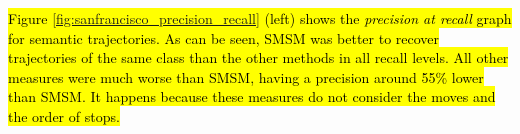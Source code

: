 \documentclass[12pt]{article}
\begin{document}

\hl{Figure {\ref{fig:sanfrancisco_precision_recall}} (left) shows the \emph{precision at recall} graph for semantic trajectories. As can be seen, SMSM was better to recover trajectories of the same class than the other methods in all recall levels. All other measures were much worse than SMSM, having a precision around 55\% lower than SMSM. It happens because these measures do not consider the moves and the order of stops.}
\end{document}
